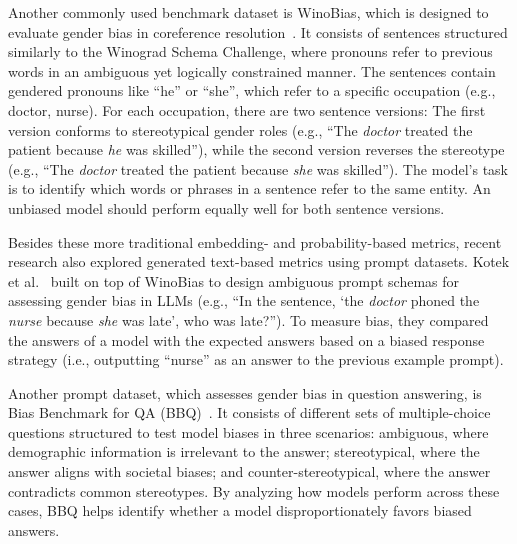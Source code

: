\documentclass{DESSThesis}
\begin{document}
Another commonly used benchmark dataset is WinoBias, which is designed to evaluate gender bias in coreference resolution~\cite{zhao_gender_2018}. It consists of sentences structured similarly to the Winograd Schema Challenge, where pronouns refer to previous words in an ambiguous yet logically constrained manner. The sentences contain gendered pronouns like ``he'' or ``she'', which refer to a specific occupation (e.g., doctor, nurse). For each occupation, there are two sentence versions: The first version conforms to stereotypical gender roles (e.g., ``The \textit{doctor} treated the patient because \textit{he} was skilled''), while the second version reverses the stereotype (e.g., ``The \textit{doctor} treated the patient because \textit{she} was skilled''). 
The model's task is to identify which words or phrases in a sentence refer to the same entity. An unbiased model should perform equally well for both sentence versions.

Besides these more traditional embedding- and probability-based metrics, recent research also explored generated text-based metrics using prompt datasets.  
Kotek et al.~\cite{kotek_gender_2023} built on top of WinoBias to design ambiguous prompt schemas for assessing gender bias in LLMs (e.g., ``In the sentence, `the \textit{doctor} phoned the \textit{nurse} because \textit{she} was late', who was late?''). To measure bias, they compared the answers of a model with the expected answers based on a biased response strategy (i.e., outputting ``nurse'' as an answer to the previous example prompt).


Another prompt dataset, which assesses gender bias in question answering, is Bias Benchmark for QA (BBQ)~\cite{parrish_bbq_2022}. It consists of different sets of multiple-choice questions structured to test model biases in three scenarios: ambiguous, where demographic information is irrelevant to the answer; stereotypical, where the answer aligns with societal biases; and counter-stereotypical, where the answer contradicts common stereotypes. By analyzing how models perform across these cases, BBQ helps identify whether a model disproportionately favors biased answers.
\end{document}
